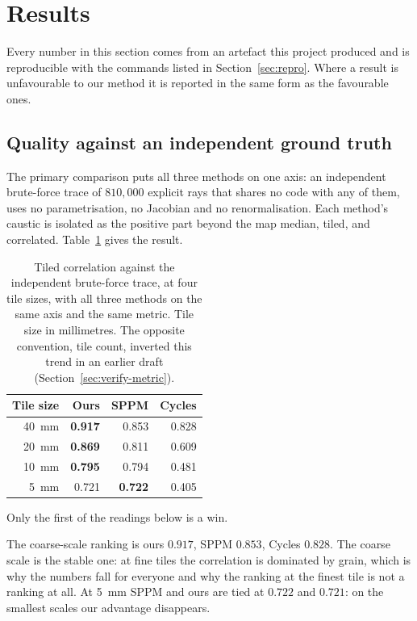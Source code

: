 \section{Results}
\label{sec:results}

Every number in this section comes from an artefact this project produced and
is reproducible with the commands listed in Section~\ref{sec:repro}. Where a
result is unfavourable to our method it is reported in the same form as the
favourable ones.

\subsection{Quality against an independent ground truth}
\label{sec:results-quality}

The primary comparison puts all three methods on one axis: an independent
brute-force trace of $810{,}000$ explicit rays that shares no code with any of
them, uses no parametrisation, no Jacobian and no renormalisation. Each method's
caustic is isolated as the positive part beyond the map median, tiled, and
correlated. Table~\ref{tab:threeway} gives the result.

\begin{table}[tbp]
\centering
\caption{Tiled correlation against the independent brute-force trace, at four
tile sizes, with all three methods on the same axis and the same metric. Tile size in millimetres. The opposite convention, tile count, inverted this trend in an earlier draft (Section~\ref{sec:verify-metric}).}
\label{tab:threeway}
\small
\begin{tabular}{@{}rrrr@{}}
\toprule
Tile size & Ours & SPPM & Cycles \\
\midrule
\SI{40}{\milli\meter} & \textbf{0.917} & 0.853 & 0.828 \\
\SI{20}{\milli\meter} & \textbf{0.869} & 0.811 & 0.609 \\
\SI{10}{\milli\meter} & \textbf{0.795} & 0.794 & 0.481 \\
\SI{5}{\milli\meter}  & 0.721 & \textbf{0.722} & 0.405 \\
\bottomrule
\end{tabular}
\end{table}

Only the first of the readings below is a win.

The coarse-scale ranking is ours $0.917$, SPPM $0.853$, Cycles $0.828$. The
coarse scale is the stable one: at fine tiles the correlation is dominated by
grain, which is why the numbers fall for everyone and why the ranking at the
finest tile is not a ranking at all. At \SI{5}{\milli\meter} SPPM and ours are
tied at $0.722$ and $0.721$: on the smallest scales our advantage disappears.

